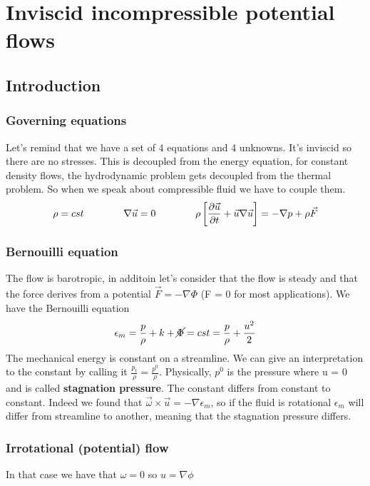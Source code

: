 
\chapter{Inviscid incompressible potential flows}

\section{Introduction}
	\subsection{Governing equations}
		Let's remind that we have a set of 4 equations and 4 unknowns. It's inviscid so there are no stresses. This is decoupled from the energy equation, for constant density flows, the hydrodynamic problem gets decoupled from the thermal problem. So when we speak about compressible fluid we have to couple them. 
		\begin{equation}
			\rho = cst \qquad\qquad \nabla \vec{u} = 0 \qquad\qquad \rho \left[\frac{\D \vec{u}}{\D t} + \vec{u} \nabla \vec{u} \right] = -\nabla p +\rho \vec{F}
		\end{equation}
		
	\subsection{Bernouilli equation}
		The flow is barotropic, in additoin let's consider that the flow is steady and that the force derives from a potential $\vec{F} = -\nabla \Phi$ (F = 0 for most applications). We have the Bernouilli equation
		\begin{equation}
			\epsilon _m = \frac{p}{\rho}+k + \cancel{\Phi} = cst = \frac{p}{\rho} +\frac{u^2}{2}
		\end{equation}
		The mechanical energy is constant on a streamline. We can give an interpretation to the constant by calling it $\frac{p_t}{\rho} = \frac{p^0}{\rho}$. Physically, $p^0$ is the pressure where u = 0 and is called \textbf{stagnation pressure}. The constant differs from constant to constant. Indeed we found that $\vec{\omega}\times \vec{u} = -\nabla \epsilon _m$, so if the fluid is rotational $\epsilon _m$ will differ from streamline to another, meaning that the stagnation pressure differs. 
		
	\subsection{Irrotational (potential) flow}
		In that case we have that $\omega = 0$ so $u = \nabla \phi$ 
